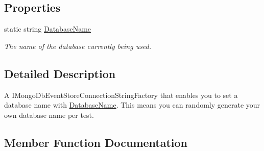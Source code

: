 \subsection*{Properties}
\begin{DoxyCompactItemize}
\item 
static string \hyperlink{classCqrs_1_1MongoDB_1_1Tests_1_1Integration_1_1TestMongoEventStoreConnectionStringFactory_a647bfdbf4eef2cffe60f86e3ac01efac_a647bfdbf4eef2cffe60f86e3ac01efac}{Database\+Name}
\begin{DoxyCompactList}\small\item\em The name of the database currently being used. \end{DoxyCompactList}\end{DoxyCompactItemize}


\subsection{Detailed Description}
A I\+Mongo\+Db\+Event\+Store\+Connection\+String\+Factory that enables you to set a database name with \hyperlink{classCqrs_1_1MongoDB_1_1Tests_1_1Integration_1_1TestMongoEventStoreConnectionStringFactory_a647bfdbf4eef2cffe60f86e3ac01efac_a647bfdbf4eef2cffe60f86e3ac01efac}{Database\+Name}. This means you can randomly generate your own database name per test. 



\subsection{Member Function Documentation}
\mbox{\label{classCqrs_1_1MongoDB_1_1Tests_1_1Integration_1_1TestMongoEventStoreConnectionStringFactory_a73b68d1160bae4e92bed4445303d6a8f_a73b68d1160bae4e92bed4445303d6a8f}} 
